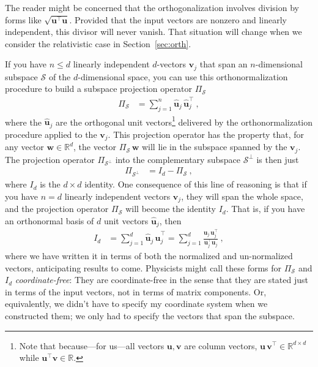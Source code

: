 \documentclass{article}
\newcommand{\proj}{\mathsf{\Pi}}
\newcommand{\Evec}[1]{{\mathbf{#1}}} %
\newcommand{\Ehat}[1]{{\mathbf{\hat{#1}}}} %
\newcommand{\secref}[1]{Section~\ref{#1}}
\begin{document}
The reader might be concerned that the orthogonalization involves division by forms like $\sqrt{\Evec{u}^\top\Evec{u}}$.
Provided that the input vectors are nonzero and linearly independent, this divisor will never vanish.
That situation will change when we consider the relativistic case in \secref{sec:orth}.

If you have $n\leq d$ linearly independent $d$-vectors $\Evec{v}_j$ that span an $n$-dimensional subspace $\mathscr{S}$ of the $d$-dimensional space, you can use this orthonormalization procedure to build a subspace projection operator $\proj_\mathscr{S}$
\begin{align}\label{eq:oproj}
    \proj_\mathscr{S} &= \sum_{j=1}^n \Ehat{u}_j\,\Ehat{u}_j^\top ~,
\end{align}
where the $\Ehat{u}_j$ are the orthogonal unit vectors\footnote{Note that because---for us---all vectors $\Evec{u},\Evec{v}$ are column vectors, $\Evec{u}\,\Evec{v}^\top\in\mathbb{R}^{d\times d}$ while $\Evec{u}^\top \Evec{v}\in\mathbb{R}$.} delivered by the orthonormalization procedure applied to the $\Evec{v}_j$.
This projection operator has the property that, for any vector $\Evec{w}\in\mathbb{R}^d$, the vector $\proj_\mathscr{S}\,\Evec{w}$ will lie in the subspace spanned by the $\Evec{v}_j$.
The projection operator $\proj_{\mathscr{S}^\perp}$ into the complementary subspace $\mathscr{S}^\perp$ is then just
\begin{align}\label{eq:oprojcomp}
    \proj_{\mathscr{S}^\perp} &= I_d - \proj_\mathscr{S} ~,
\end{align}
where $I_d$ is the $d\times d$ identity.
One consequence of this line of reasoning is that if you have $n=d$ linearly independent vectors $\Evec{v}_j$, they will span the whole space, and the projection operator $\proj_\mathscr{S}$ will become the identity $I_d$.
That is, if you have an orthonormal basis of $d$ unit vectors $\Ehat{u}_j$, then
\begin{align}\label{eq:oI}
    I_d &= \sum_{j=1}^d \Ehat{u}_j\,\Ehat{u}_j^\top = \sum_{j=1}^d \frac{\Evec{u}_j\,\Evec{u}_j^\top}{\Evec{u}_j^\top\Evec{u}_j} ~,
\end{align}
where we have written it in terms of both the normalized and un-normalized vectors, anticipating results to come.
Physicists might call these forms for $\proj_\mathscr{S}$ and $I_d$ \emph{coordinate-free}:
They are coordinate-free in the sense that they are stated just in terms of the input vectors, not in terms of matrix components.
Or, equivalently, we didn't have to specify my coordinate system when we constructed them; we only had to specify the vectors that span the subspace.
\end{document}
